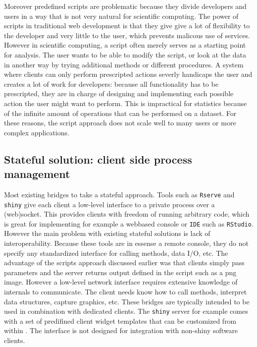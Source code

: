 Moreover predefined scripts are problematic because they divide developers and users in a way that is not very natural for scientific computing. The power of scripts in traditional web development is that they give give a lot of flexibility to the developer and very little to the user, which prevents malicous use of services. However in scientific computing, a script often  merely serves as a starting point for analysis. The user wants to be able to modify the script, or look at the data in another way by trying additional methods or different procedures. A system where clients can only perform prescripted actions severly handicaps the user and creates a lot of work for developers: because all functionality has to be prescripted, they are in charge of designing and implementing each possible action the user might want to perform. This is impractical for statistics because of the infinite amount of operations that can be performed on a dataset. For these reasons, the script approach does not scale well to many users or more complex applications.

\subsection{Stateful solution: client side process management}

Most existing bridges to \R take a stateful approach. Tools such as \texttt{Rserve} \citep{urbanek2013rserve} and \texttt{shiny} \citep{shiny} give each client a low-level interface to a private \R process over a (web)socket. This provides clients with freedom of running arbitrary \R code, which is great for implementing for example a webbased console or \texttt{IDE} such as \texttt{RStudio}. However the main problem with existing stateful solutions is lack of interoperability. Because these tools are in essense a remote \R console, they do not specify any standardized interface for calling methods, data I/O, etc. The advantage of the scripts approach discussed earlier was that clients simply pass parameters and the server returns output defined in the script such as a png image. However a low-level network interface requires extensive knowledge of \R internals to communicate. The client needs know how to call \R methods, interpret \R data structures, capture graphics, etc. These bridges are typically intended to be used in combination with dedicated clients. The \texttt{shiny} server for example comes with a set of predifined client widget templates that can be customized from within \R. The interface is not designed for integration with non-shiny software clients.

